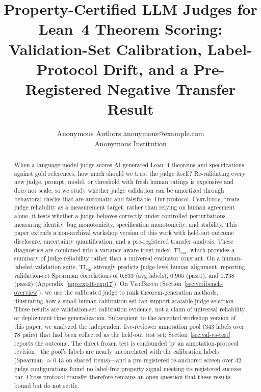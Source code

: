 \documentclass{article}
\title{Property-Certified LLM Judges for Lean~4 Theorem Scoring: Validation-Set Calibration, Label-Protocol Drift, and a Pre-Registered Negative Transfer Result}
\author{\name Anonymous Authors \email anonymous@example.com \\
  \addr Anonymous Institution}
\begin{document}
\maketitle
\begin{abstract}
  When a language-model judge scores AI-generated Lean~4 theorems and specifications against gold references, how much should we trust the judge itself? Re-validating every new judge, prompt, model, or threshold with fresh human ratings is expensive and does not scale, so we study whether judge validation can be amortized through behavioral checks that are automatic and falsifiable. Our protocol, \textsc{CertJudge}, treats judge reliability as a measurement target: rather than relying on human agreement alone, it tests whether a judge behaves correctly under controlled perturbations measuring identity, bug monotonicity, specification monotonicity, and stability. This paper extends a non-archival workshop version of this work with held-out outcome disclosure, uncertainty quantification, and a pre-registered transfer analysis. These diagnostics are combined into a variance-aware trust index, \(\mathrm{TI}_{\mathrm{var}}\), which provides a summary of judge reliability rather than a universal evaluator constant. On a human-labeled validation suite, \(\mathrm{TI}_{\mathrm{var}}\) strongly predicts judge-level human alignment, reporting validation-set Spearman correlations of \(0.833\) (avg labels), \(0.905\) (pass1), and \(0.738\) (pass2) (Appendix~\ref{app:exp16-exp17}). On \textsc{VeriBench} (Section~\ref{sec:veribench-overview}), we use the calibrated judge to rank theorem-generation methods, illustrating how a small human calibration set can support scalable judge selection. These results are validation-set calibration evidence, not a claim of universal reliability or deployment-time generalization. Subsequent to the accepted workshop version of this paper, we analyzed the independent five-reviewer annotation pool (\(343\) labels over \(78\) pairs) that had been collected as the held-out test set; Section~\ref{sec:val-vs-test} reports the outcome. The direct frozen test is confounded by an annotation-protocol revision---the pool's labels are nearly uncorrelated with the calibration labels (Spearman \(\approx 0.13\) on shared items)---and a pre-registered re-anchored screen over \(32\) judge configurations found no label-free property signal meeting its registered success bar. Cross-protocol transfer therefore remains an open question that these results bound but do not settle.


\end{abstract}
\end{document}

